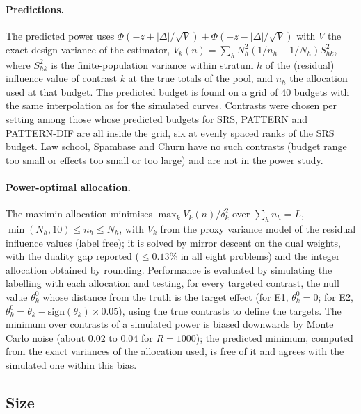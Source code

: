 \documentclass[pdflatex,sn-mathphys-num,iicol]{sn-jnl}
\theoremstyle{thmstyleone}
\theoremstyle{thmstyletwo}
\theoremstyle{thmstylethree}
\begin{document}
\paragraph{Predictions.} The predicted power uses $\Phi(-z+|\Delta|/\sqrt V)+\Phi(-z-|\Delta|/\sqrt V)$ with $V$ the exact design variance of the estimator, $V_k(n)=\sum_hN_h^2(1/n_h-1/N_h)S^2_{hk}$, where $S^2_{hk}$ is the finite-population variance within stratum $h$ of the (residual) influence value of contrast $k$ at the true totals of the pool, and $n_h$ the allocation used at that budget. The predicted budget is found on a grid of $40$ budgets with the same interpolation as for the simulated curves. Contrasts were chosen per setting among those whose predicted budgets for SRS, PATTERN and PATTERN-DIF are all inside the grid, six at evenly spaced ranks of the SRS budget. Law school, Spambase and Churn have no such contrasts (budget range too small or effects too small or too large) and are not in the power study.

\paragraph{Power-optimal allocation.} The maximin allocation minimises $\max_kV_k(n)/\delta_k^2$ over $\sum_hn_h=L$, $\min(N_h,10)\le n_h\le N_h$, with $V_k$ from the proxy variance model of the residual influence values (label free); it is solved by mirror descent on the dual weights, with the duality gap reported ($\le0.13\%$ in all eight problems) and the integer allocation obtained by rounding. Performance is evaluated by simulating the labelling with each allocation and testing, for every targeted contrast, the null value $\theta^0_k$ whose distance from the truth is the target effect (for E1, $\theta^0_k=0$; for E2, $\theta_k^0=\theta_k-\mathrm{sign}(\theta_k)\times0.05$), using the true contrasts to define the targets. The minimum over contrasts of a simulated power is biased downwards by Monte Carlo noise (about $0.02$ to $0.04$ for $R=1000$); the predicted minimum, computed from the exact variances of the allocation used, is free of it and agrees with the simulated one within this bias.

\subsection{Size}
\end{document}
